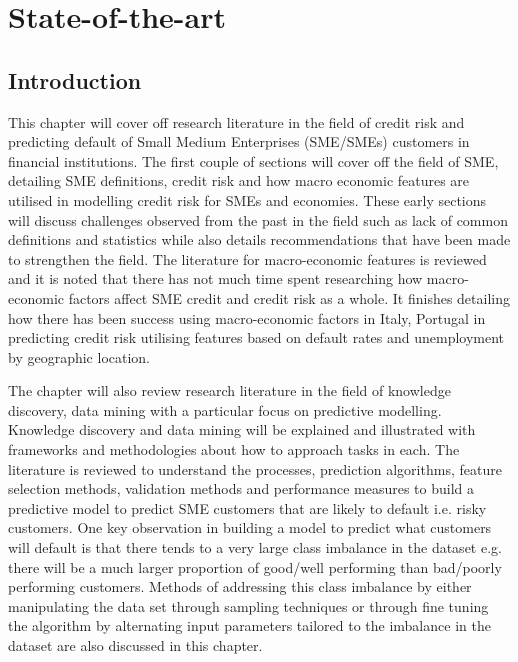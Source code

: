 
\chapter{State-of-the-art} %

\label{Chapter2} %


\section{Introduction}

This chapter will cover off research literature in the field of credit risk and predicting default of Small Medium Enterprises (SME/SMEs) customers in financial institutions. The first couple of sections will cover off the field of SME, detailing SME definitions, credit risk and how macro economic features are utilised in modelling credit risk for SMEs and economies. These early sections will discuss challenges observed from the past in the field such as lack of common definitions and statistics while also details recommendations that have been made to strengthen the field. The literature for macro-economic features is reviewed and it is noted that there has not much time spent researching how macro-economic factors affect SME credit and credit risk as a whole. It finishes detailing how there has been success using macro-economic factors in Italy, Portugal in predicting credit risk utilising features based on default rates and unemployment by geographic location.   

The chapter will also review research literature in the field of knowledge discovery, data mining with a particular focus on predictive modelling. Knowledge discovery and data mining will be explained and illustrated with frameworks and methodologies about how to approach tasks in each. The literature is reviewed to understand the processes, prediction algorithms, feature selection methods, validation methods and performance measures to build a predictive model to predict SME customers that are likely to default i.e. risky customers. One key observation in building a model to predict what customers will default is that there tends to a very large class imbalance in the dataset e.g. there will be a much larger proportion of good/well performing than bad/poorly performing customers. Methods of addressing this class imbalance by either manipulating the data set through sampling techniques or through fine tuning the algorithm by alternating input parameters tailored to the imbalance in the dataset are also discussed in this chapter.

